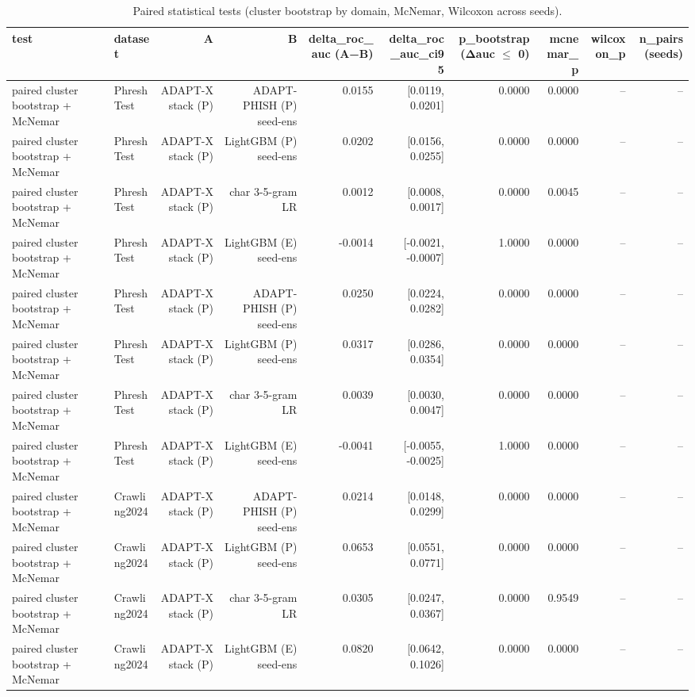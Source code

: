 \begin{table}[t]
\centering
\scriptsize
\caption{Paired statistical tests (cluster bootstrap by domain, McNemar, Wilcoxon across seeds).}
\label{tab:stats}
\begin{tabular}{llrrrrrrrr}
\toprule
test & dataset & A & B & delta\_roc\_auc (A−B) & delta\_roc\_auc\_ci95 & p\_bootstrap(Δauc $\leq$ 0) & mcnemar\_p & wilcoxon\_p & n\_pairs (seeds) \\
\midrule
paired cluster bootstrap + McNemar & PhreshTest & ADAPT-X stack (P) & ADAPT-PHISH (P) seed-ens & 0.0155 & [0.0119, 0.0201] & 0.0000 & 0.0000 & -- & -- \\
paired cluster bootstrap + McNemar & PhreshTest & ADAPT-X stack (P) & LightGBM (P) seed-ens & 0.0202 & [0.0156, 0.0255] & 0.0000 & 0.0000 & -- & -- \\
paired cluster bootstrap + McNemar & PhreshTest & ADAPT-X stack (P) & char 3-5-gram LR & 0.0012 & [0.0008, 0.0017] & 0.0000 & 0.0045 & -- & -- \\
paired cluster bootstrap + McNemar & PhreshTest & ADAPT-X stack (P) & LightGBM (E) seed-ens & -0.0014 & [-0.0021, -0.0007] & 1.0000 & 0.0000 & -- & -- \\
paired cluster bootstrap + McNemar & PhreshTest & ADAPT-X stack (P) & ADAPT-PHISH (P) seed-ens & 0.0250 & [0.0224, 0.0282] & 0.0000 & 0.0000 & -- & -- \\
paired cluster bootstrap + McNemar & PhreshTest & ADAPT-X stack (P) & LightGBM (P) seed-ens & 0.0317 & [0.0286, 0.0354] & 0.0000 & 0.0000 & -- & -- \\
paired cluster bootstrap + McNemar & PhreshTest & ADAPT-X stack (P) & char 3-5-gram LR & 0.0039 & [0.0030, 0.0047] & 0.0000 & 0.0000 & -- & -- \\
paired cluster bootstrap + McNemar & PhreshTest & ADAPT-X stack (P) & LightGBM (E) seed-ens & -0.0041 & [-0.0055, -0.0025] & 1.0000 & 0.0000 & -- & -- \\
paired cluster bootstrap + McNemar & Crawling2024 & ADAPT-X stack (P) & ADAPT-PHISH (P) seed-ens & 0.0214 & [0.0148, 0.0299] & 0.0000 & 0.0000 & -- & -- \\
paired cluster bootstrap + McNemar & Crawling2024 & ADAPT-X stack (P) & LightGBM (P) seed-ens & 0.0653 & [0.0551, 0.0771] & 0.0000 & 0.0000 & -- & -- \\
paired cluster bootstrap + McNemar & Crawling2024 & ADAPT-X stack (P) & char 3-5-gram LR & 0.0305 & [0.0247, 0.0367] & 0.0000 & 0.9549 & -- & -- \\
paired cluster bootstrap + McNemar & Crawling2024 & ADAPT-X stack (P) & LightGBM (E) seed-ens & 0.0820 & [0.0642, 0.1026] & 0.0000 & 0.0000 & -- & -- \\

\end{tabular}
\end{table}
